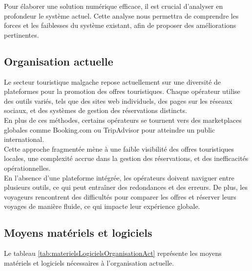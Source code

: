 \documentclass[12pt]{report}
\begin{document}
				\hspace{15pt} Pour élaborer une solution numérique efficace, il est crucial d'analyser en profondeur le système actuel. Cette analyse nous permettra de comprendre les forces et les faiblesses du système existant, afin de proposer des améliorations pertinentes.

				\subsection{Organisation actuelle}
				
				\hspace{15pt} Le secteur touristique malgache repose actuellement sur une diversité de plateformes pour la promotion des offres touristiques. Chaque opérateur utilise des outils variés, tels que des sites web individuels, des pages sur les réseaux sociaux, et des systèmes de gestion des réservations distincts. \\

				En plus de ces méthodes, certains opérateurs se tournent vers des marketplaces globales comme Booking.com ou TripAdvisor pour atteindre un public international.\\

				 Cette approche fragmentée mène à une faible visibilité des offres touristiques locales, une complexité accrue dans la gestion des réservations, et des inefficacités opérationnelles.\\

				En l'absence d'une plateforme intégrée, les opérateurs doivent naviguer entre plusieurs outils, ce qui peut entraîner des redondances et des erreurs. De plus, les voyageurs rencontrent des difficultés pour comparer les offres et réserver leurs voyages de manière fluide, ce qui impacte leur expérience globale.

				\subsection{Moyens matériels et logiciels}
				\hspace{15pt} Le tableau \ref{tab:materielsLogicielsOrganisationAct} représente les moyens matériels et logiciels nécessaires à l'organisation actuelle.
\end{document}
